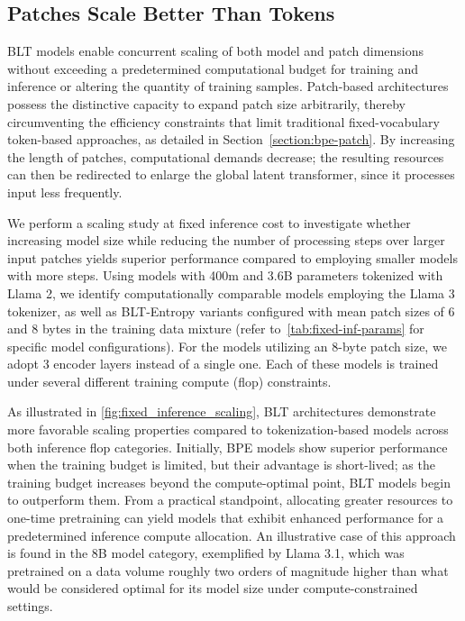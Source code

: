 \subsection{Patches Scale Better Than Tokens} {\textsc BLT} models enable concurrent scaling of both model and patch dimensions without exceeding a predetermined computational budget for training and inference or altering the quantity of training samples. Patch-based architectures possess the distinctive capacity to expand patch size arbitrarily, thereby circumventing the efficiency constraints that limit traditional fixed-vocabulary token-based approaches, as detailed in Section~\ref{section:bpe-patch}. By increasing the length of patches, computational demands decrease; the resulting resources can then be redirected to enlarge the global latent transformer, since it processes input less frequently.

We perform a scaling study at fixed inference cost to investigate whether increasing model size while reducing the number of processing steps over larger input patches yields superior performance compared to employing smaller models with more steps. Using models with 400m and 3.6B parameters tokenized with Llama 2, we identify computationally comparable models employing the Llama 3 tokenizer, as well as {\textsc BLT}-Entropy variants configured with mean patch sizes of 6 and 8 bytes in the training data mixture (refer to~\autoref{tab:fixed-inf-params} for specific model configurations). For the models utilizing an 8-byte patch size, we adopt 3 encoder layers instead of a single one. Each of these models is trained under several different training compute (flop) constraints.

As illustrated in \autoref{fig:fixed_inference_scaling}, {\textsc BLT} architectures demonstrate more favorable scaling properties compared to tokenization-based models across both inference flop categories. Initially, BPE models show superior performance when the training budget is limited, but their advantage is short-lived; as the training budget increases beyond the compute-optimal point, {\textsc BLT} models begin to outperform them. From a practical standpoint, allocating greater resources to one-time pretraining can yield models that exhibit enhanced performance for a predetermined inference compute allocation. An illustrative case of this approach is found in the 8B model category, exemplified by Llama 3.1, which was pretrained on a data volume roughly two orders of magnitude higher than what would be considered optimal for its model size under compute-constrained settings.

